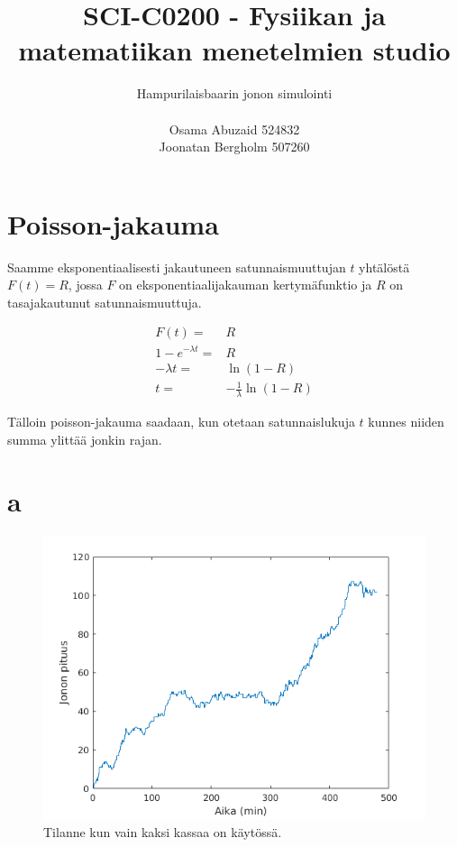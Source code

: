\documentclass{article}     %
\title{SCI-C0200 - Fysiikan ja matematiikan menetelmien studio}
\author{Hampurilaisbaarin jonon simulointi\\ \\ Osama Abuzaid 524832 \\ Joonatan Bergholm 507260}
\begin{document}
\maketitle
\newpage

\pagestyle{fancy}
\lstset{language = Matlab}

\section*{Poisson-jakauma}

Saamme eksponentiaalisesti jakautuneen satunnaismuuttujan $t$ yhtälöstä $F(t) = R$, jossa $F$ on eksponentiaalijakauman kertymäfunktio ja $R$ on tasajakautunut satunnaismuuttuja.

\begin{align*}
F(t) =& R \\
1-e^{-\lambda t} =& R \\
-\lambda t =& \ln (1 - R) \\
t =& -\frac{1}{\lambda} \ln (1 - R)
\end{align*}

Tälloin poisson-jakauma saadaan, kun otetaan satunnaislukuja $t$ kunnes niiden summa ylittää jonkin rajan.

\section*{a}

\begin{figure}
\centering
\includegraphics[width = \textwidth]{matlab/a.png}
\caption{Tilanne kun vain kaksi kassaa on käytössä.}
\label{fig:a}
\end{figure}
\end{document}
